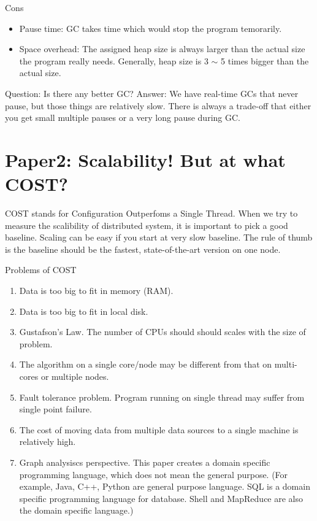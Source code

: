 Cons
\begin{itemize}
  \item Pause time: GC takes time which would stop the program temorarily.
  \item Space overhead: The assigned heap size is always larger than the actual size the program really needs. Generally, heap size is 3 $\sim$ 5 times bigger than the actual size.
\end{itemize}

Question: Is there any better GC?
Answer: We have real-time GCs that never pause, but those things are relatively slow. There is always a trade-off that either you get small multiple pauses or a very long pause during GC.

\section{Paper2: Scalability! But at what COST?}
COST stands for Configuration Outperfoms a Single Thread. When we try to measure the scalibility of distributed system, it is important to pick a good baseline. Scaling can be easy if you start at very slow baseline. The rule of thumb is the baseline should be the fastest, state-of-the-art version on one node.

Problems of COST
\begin{enumerate}
  \item Data is too big to fit in memory (RAM).
  \item Data is too big to fit in local disk.
  \item Gustafson’s Law. The number of CPUs should should scales with the size of problem.
  \item The algorithm on a single core/node may be different from that on multi-cores or multiple nodes.
  \item Fault tolerance problem. Program running on single thread may suffer from single point failure.
  \item The cost of moving data from multiple data sources to a single machine is relatively high.
  \item Graph analysiscs perspective. This paper creates a domain specific programming language, which does not mean the general purpose. (For example, Java, C++, Python are general purpose language. SQL is a domain specific programming language for database. Shell and MapReduce are also the domain specific language.)
\end{enumerate}

